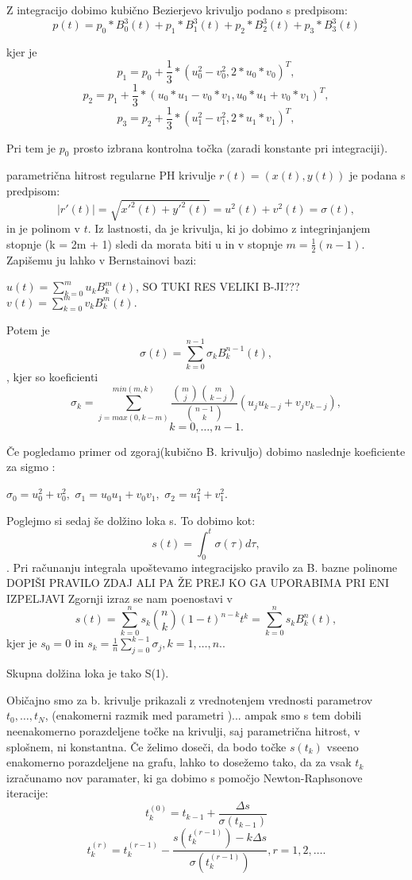 \documentclass[12pt]{article}
\begin{document}
Z integracijo dobimo kubično Bezierjevo krivuljo podano s predpisom:
$$p(t) = p_0*B_0^3(t) + p_1*B_1^3(t) + p_2*B_2^3(t) + p_3*B_3^3(t)$$

kjer je
$$p_1 = p_0 + \frac{1}{3}*(u_0^2 - v_0^2, 2*u_0*v_0)^T,$$
$$p_2 = p_1 + \frac{1}{3}*(u_0*u_1 - v_0*v_1, u_0*u_1 + v_0*v_1)^T,$$
$$p_3 = p_2 + \frac{1}{3}*(u_1^2 - v_1^2, 2*u_1*v_1)^T,$$

Pri tem je $p_0$ prosto izbrana kontrolna točka (zaradi konstante pri integraciji).

parametrična hitrost regularne PH krivulje $r(t) = (x(t), y(t))$ je podana s predpisom:
$$ | r\prime (t) | =\sqrt{x\prime^2(t)+y\prime^2(t)}= u^2 (t) + v^2 (t) = \sigma (t),$$
in je polinom v $t$. 
Iz lastnosti, da je krivulja, ki jo dobimo z integrinjanjem stopnje (k = 2m + 1) sledi
da morata biti u in v stopnje  $m = \frac{1}{2}(n - 1)$. Zapišemu ju lahko v 
Bernstainovi bazi:

	$u (t)=\sum_{k=0}^m u_kB_k^m(t)$, SO TUKI RES VELIKI B-JI???
	$v (t) =\sum_{k=0}^m v_kB_k^m(t).$

Potem je 
$$\sigma (t) =\sum_{k=0}^{n-1} \sigma_kB_k^{n-1}(t),$$, 
kjer so koeficienti 
$$\sigma_k =\sum_{j=max(0,k-m)}^{min(m,k)}\frac{\binom{m}{j}\binom{m}{k-j}}{\binom{n-1}{k}}(u_ju_{k-j}+v_jv_{k-j}),$$ $$k = 0,\ldots , n - 1.$$

Če pogledamo primer od zgoraj(kubično B. krivuljo) dobimo naslednje koeficiente za sigmo :

$\sigma_0 = u^2_0+ v^2_0, $
$\sigma_1 = u_0u_1 + v_0v_1,$ 
$\sigma_2 = u^2_1+ v^2_1.$

Poglejmo si sedaj še dolžino loka s.
To dobimo kot:
$$s (t) =\int^t_0\sigma(\tau) d\tau,$$.
Pri računanju integrala upoštevamo integracijsko pravilo za B. bazne polinome 
DOPIŠI PRAVILO ZDAJ ALI PA ŽE PREJ KO GA UPORABIMA PRI ENI IZPELJAVI
Zgornji izraz se nam poenostavi v 
$$s (t) =\sum^n_{k=0}s_k\binom{n}{k}(1-t)^{n-k}t^k=\sum_{k=0}^n s_kB^n_k(t),$$
	kjer je $s_0=0$ in $s_k=\frac{1}{n}\sum^{k-1}_{j=0}\sigma_j, k=1,\ldots,n.$.

Skupna dolžina loka je tako S(1). 

Običajno smo za  b. krivulje prikazali z vrednotenjem vrednosti parametrov  $t_0,\ldots , t_N$,
(enakomerni razmik med parametri )... 
ampak smo s tem dobili neenakomerno porazdeljene točke na krivulji, saj parametrična 
hitrost, v splošnem, ni konstantna.
Če želimo doseči, da bodo točke $s(t_k)$ vseeno enakomerno porazdeljene na grafu,
lahko to dosežemo tako, da za vsak $t_k$ izračunamo nov paramater, ki ga dobimo 
s pomočjo Newton-Raphsonove iteracije: 
$$t^{(0)}_k = t_{k-1}+\frac{\Delta s}{\sigma(t_{k-1})}$$
$$t^{(r)}_k = t^{(r-1)}_k-\frac{s(t^{(r-1)}_k)-k\Delta s}{\sigma(t^{(r-1)}_k)}, r = 1, 2,\ldots.$$
\end{document}
